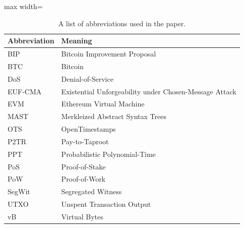 \begin{table}[h]
\centering
\caption{A list of abbreviations used in the paper.}
\label{tab:abbrev}
\footnotesize
\renewcommand{\arraystretch}{1.2}

\begin{adjustbox}{max width=\linewidth}
\begin{tabular}{
>{\raggedright\arraybackslash}m{3cm}
>{\raggedright\arraybackslash}m{10cm}
}
\toprule
\textbf{Abbreviation} & \textbf{Meaning} \\
\midrule

BIP & Bitcoin Improvement Proposal \\
BTC & Bitcoin \\
DoS & Denial-of-Service \\
EUF-CMA & Existential Unforgeability under Chosen-Message Attack \\
EVM & Ethereum Virtual Machine \\
MAST & Merkleized Abstract Syntax Trees \\
OTS & OpenTimestamps \\
P2TR & Pay-to-Taproot \\
PPT & Probabilistic Polynomial-Time \\
PoS & Proof-of-Stake \\
PoW & Proof-of-Work \\
SegWit & Segregated Witness \\
UTXO & Unspent Transaction Output \\
vB & Virtual Bytes \\
\bottomrule
\end{tabular}
\end{adjustbox}
\end{table}

